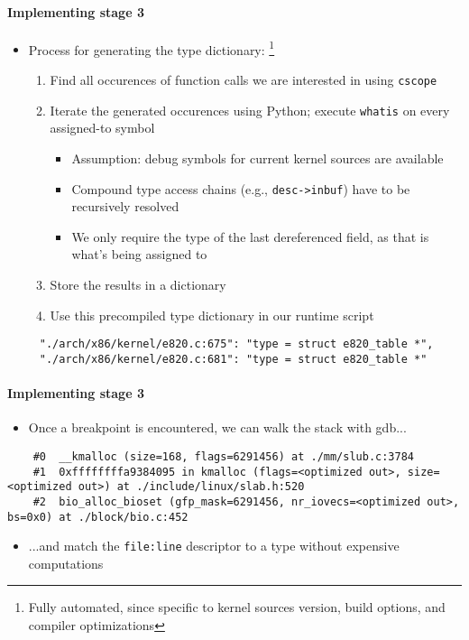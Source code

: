 \documentclass{i20lecture}
\begin{document}
\begin{frame}[fragile]{\insertsection}
  \framesubtitle{Implementing stage 3}
    \begin{itemize}
     \item Process for generating the type dictionary: \footnote{Fully automated, since specific to kernel sources version, build options, and compiler optimizations}
\pause
     \begin{enumerate}
      \item Find all occurences of function calls we are interested in using \texttt{cscope}
\pause
      \item Iterate the generated occurences using Python; execute \texttt{whatis} on every assigned-to symbol
      \begin{itemize}
\pause
       \item Assumption: debug symbols for current kernel sources are available
\pause
       \item Compound type access chains (e.g., \lstinline|desc->inbuf|) have to be recursively resolved
	\pause
	   \item We only require the type of the last dereferenced field, as that is what's being assigned to
      \end{itemize}
\pause
      \item Store the results in a dictionary
\pause
      \item Use this precompiled type dictionary in our runtime script
\pause
     \end{enumerate}
    \end{itemize}
    \begin{lstlisting}
     "./arch/x86/kernel/e820.c:675": "type = struct e820_table *",
     "./arch/x86/kernel/e820.c:681": "type = struct e820_table *"
    \end{lstlisting}
\end{frame}

\begin{frame}[fragile]{\insertsection}
  \framesubtitle{Implementing stage 3}
    \begin{itemize}
     \item Once a breakpoint is encountered, we can walk the stack with gdb...
    \end{itemize}
\pause
    \begin{lstlisting}
    #0  __kmalloc (size=168, flags=6291456) at ./mm/slub.c:3784
    #1  0xffffffffa9384095 in kmalloc (flags=<optimized out>, size=<optimized out>) at ./include/linux/slab.h:520
    #2  bio_alloc_bioset (gfp_mask=6291456, nr_iovecs=<optimized out>, bs=0x0) at ./block/bio.c:452
    \end{lstlisting}
\pause
    \begin{itemize}
     \item ...and match the \texttt{file:line} descriptor to a type without expensive computations
    \end{itemize}
\end{frame}
\end{document}
